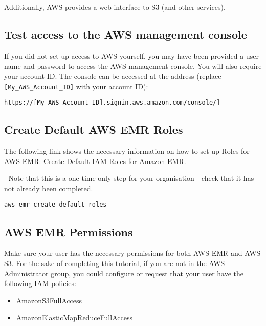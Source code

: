 \documentclass[]{book}
\providecommand{\tightlist}{%
  \setlength{\itemsep}{0pt}\setlength{\parskip}{0pt}}
\begin{document}
Additionally, AWS provides a web interface to S3 (and other services).

\hypertarget{test-access-to-the-aws-management-console}{%
\subsection{Test access to the AWS management console}\label{test-access-to-the-aws-management-console}}

If you did not set up access to AWS yourself, you may have been provided a user name and password to access the AWS management console. You will also require your account ID. The console can be accessed at the address (replace \texttt{{[}My\_AWS\_Account\_ID{]}} with your account ID):

\begin{verbatim}
https://[My_AWS_Account_ID].signin.aws.amazon.com/console/]
\end{verbatim}

\hypertarget{create-default-aws-emr-roles}{%
\subsection{Create Default AWS EMR Roles}\label{create-default-aws-emr-roles}}

The following link shows the necessary information on how to set up Roles for AWS EMR: Create Default IAM Roles for Amazon EMR.

🔴 Note that this is a one-time only step for your organisation - check that it has not already been completed.

\begin{verbatim}
aws emr create-default-roles
\end{verbatim}

\hypertarget{aws-emr-permissions}{%
\subsection{AWS EMR Permissions}\label{aws-emr-permissions}}

Make sure your user has the necessary permissions for both AWS EMR and AWS S3. For the sake of completing this tutorial, if you are not in the AWS Administrator group, you could configure or request that your user have the following IAM policies:

\begin{itemize}
\tightlist
\item
  AmazonS3FullAccess
\item
  AmazonElasticMapReduceFullAccess
\end{itemize}
\end{document}
